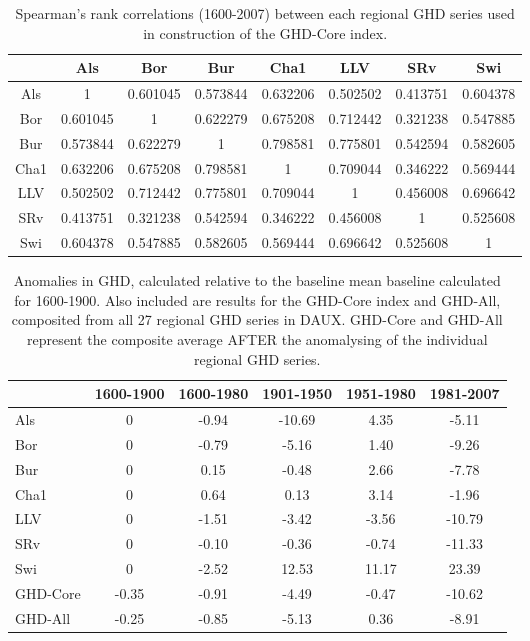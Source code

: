 \documentclass[12pt]{article}
\begin{document}
\begin{table}
\small
\caption{\small Spearman's rank correlations (1600-2007) between each regional GHD series used in construction of the GHD-Core index.}
\centering
\begin{tabular}{c c c c c c c c}
\hline
& Als & Bor & Bur & Cha1 & LLV & SRv & Swi \\
\hline
Als	& 1	& 0.601045	& 0.573844	& 0.632206	& 0.502502	& 0.413751	& 0.604378\\
Bor & 0.601045 	& 1	& 0.622279		& 0.675208	& 0.712442 	& 0.321238 	& 0.547885\\
Bur &	0.573844	& 0.622279	& 1	& 0.798581	& 0.775801	& 0.542594	& 0.582605\\
Cha1	& 0.632206	& 0.675208	& 0.798581	& 1	 & 0.709044	& 0.346222	& 0.569444\\
LLV	& 0.502502	& 0.712442	& 0.775801	& 0.709044	& 1 & 0.456008 & 0.696642\\
SRv	& 0.413751	& 0.321238	& 0.542594	& 0.346222	& 0.456008	& 1	 & 0.525608\\
Swi	 & 0.604378	& 0.547885	& 0.582605	& 0.569444	& 0.696642	& 0.525608	& 1\\
\hline
\end{tabular}
\end{table}

\begin{table}
\small
\caption{\small Anomalies in GHD, calculated relative to the baseline mean baseline calculated for 1600-1900. Also included are results for the GHD-Core index and GHD-All, composited from all 27 regional GHD series in DAUX. GHD-Core and GHD-All represent the composite average AFTER the anomalysing of the individual regional GHD series.}
\centering
\begin{tabular}{l c c c c c}
\hline
& \bf 1600-1900 & \bf 1600-1980 & \bf 1901-1950 & \bf 1951-1980 & \bf 1981-2007\\
\hline
Als	& 0	& -0.94 & -10.69 & 4.35 & -5.11\\
Bor	& 0 & -0.79 & -5.16 & 1.40 & -9.26\\
Bur	& 0	& 0.15	& -0.48	& 2.66	& -7.78\\
Cha1	& 0	& 0.64	& 0.13	& 3.14	& -1.96\\
LLV	& 0	& -1.51	& -3.42	& -3.56	& -10.79\\
SRv & 0	& -0.10	& -0.36	& -0.74	& -11.33\\
Swi	& 0	& -2.52	& 12.53	& 11.17	& 23.39\\
\hline
GHD-Core & -0.35 & -0.91	& -4.49 & -0.47 & 	-10.62\\
GHD-All	& -0.25 & -0.85 & -5.13 & 0.36 & -8.91\\
\hline
\end{tabular}
\end{table}
\end{document}
